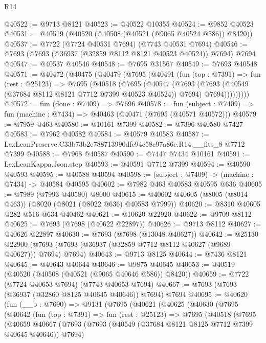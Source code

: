 \begin{lexlean}{R14}
\begin{coremodule}
@40522 := @9713 @8121
@40523 := @40522 @10355
@40524 := @9852 @40523
@40531 := @40519 (@40520 (@40508 (@40521 (@9065 @40524 @586)) @8420))
@40537 := @7722 (@7724 @40531 @7694) (@7743 @40531 @7694)
@40546 := @7693 (@7693 (@36937 (@32859 @8112 @8121 @40523 @40524)) @7694) @7694
@40547 := @40537 @40546
@40548 := @7695 @31567
@40549 := @7693 @40548
@40571 := @40472
    (@40475
      (@40479
        (@7695
          (@40491
            (fun (top : @7391) =>
            fun (rest : @25123) =>
            @7695
              (@40518
                (@7695
                  (@40547
                    (@7693
                      (@7693 (@40549 (@37684 @8112 @8121 @7712 @7399 @40523 @40524)) @7694)
                      @7694)))))))))
@40572 := fun (done : @7409) => @7696
@40578 := fun (subject : @7409) => fun (machine : @7434) => @40463 (@40471 (@7695 (@40571 @40572)))
@40579 := @7959 @463
@40580 := @10161 @7399
@40582 := @7396 @40580 @7427
@40583 := @7962 @40582
@40584 := @40579 @40583
@40587 := LexLeanPreserve.C33b73b2e788713990dfe94c58c97a86e.R14.__fits_8 @7712 @7399
@40588 := @7968 @40587
@40590 := @7447 @7434 @10161
@40591 := LexLeanKappa.Json.step
@40593 := @40591 @7712 @7399
@40594 := @40590 @40593
@40595 := @40588 @40594
@40598 := (subject : @7409) -> (machine : @7434) -> @40584 @40595
@40602 := @7982 @463 @40583 @40595 @636
@40605 := @7989 (@7993 @40580) @8000
@40615 := @40602 @40605 (@8005 (@8014 @463)) (@8020 (@8021 (@8022 @636) @40583 @7999))
@40620 := @8310 @40605 @282 @516 @634 @40462
@40621 := @10620 @22920
@40622 := @9709 @8112
@40625 := @7693 (@7698 (@40622 @22897))
@40626 := @9713 @8112
@40627 := @40626 @22897
@40630 := @7693 (@7698 (@13048 @40627))
@40642 := @25130
    @22900
    (@7693 (@7693 (@36937 (@32859 @7712 @8112 @40627 (@9689 @40627))) @7694) @7694)
@40643 := @9713 @8125
@40644 := @7436 @8121
@40645 := @40643 @40644
@40646 := @9875 @40645
@40653 := @40519 (@40520 (@40508 (@40521 (@9065 @40646 @586)) @8420))
@40659 := @7722 (@7724 @40653 @7694) (@7743 @40653 @7694)
@40667 := @7693 (@7693 (@36937 (@32860 @8125 @40645 @40646)) @7694) @7694
@40695 := @40620
    (fun (__b : @7690) =>
    @9131
      (@7695
        (@40621
          (@40625
            (@40630
              (@7695
                (@40642
                  (fun (top : @7391) =>
                  fun (rest : @25123) =>
                  @7695
                    (@40518
                      (@7695
                        (@40659
                          @40667
                          (@7693
                            (@7693 (@40549 (@37684 @8121 @8125 @7712 @7399 @40645 @40646)) @7694)

\end{coremodule}
\end{lexlean}
